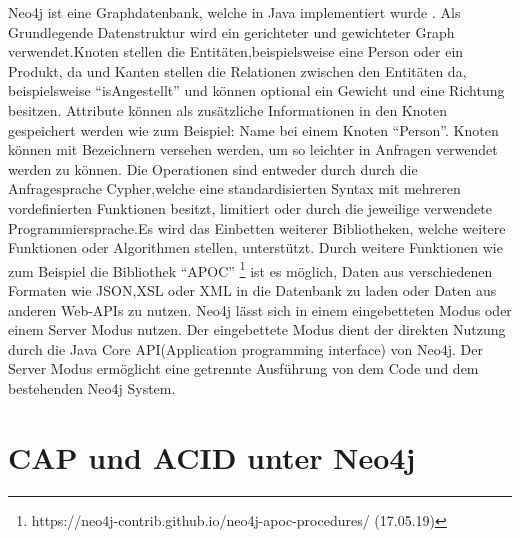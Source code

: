 Neo4j ist eine Graphdatenbank, welche in Java implementiert wurde \parencite{vukotic2015neo4j}. Als Grundlegende Datenstruktur wird ein gerichteter und gewichteter  Graph verwendet.Knoten stellen die Entitäten,beispielsweise eine Person oder ein Produkt,  da und  Kanten stellen die Relationen zwischen den Entitäten da, beispielsweise “isAngestellt” und können optional ein Gewicht und eine Richtung besitzen. Attribute können als zusätzliche Informationen in den Knoten gespeichert  werden wie zum Beispiel: Name bei einem Knoten “Person”. Knoten können mit Bezeichnern versehen werden, um so leichter in Anfragen  verwendet werden zu können. Die Operationen sind entweder durch durch die  Anfragesprache  Cypher,welche eine standardisierten Syntax mit  mehreren vordefinierten Funktionen besitzt, limitiert oder durch die jeweilige verwendete Programmiersprache.Es wird das Einbetten weiterer Bibliotheken, welche weitere Funktionen oder Algorithmen stellen, unterstützt. Durch weitere Funktionen wie zum Beispiel die Bibliothek “APOC” \footnote{https://neo4j-contrib.github.io/neo4j-apoc-procedures/ (17.05.19) } ist es möglich, Daten aus verschiedenen Formaten wie JSON,XSL oder XML in die Datenbank zu laden oder Daten aus anderen Web-APIs zu nutzen. Neo4j lässt sich in einem  eingebetteten Modus oder einem  Server Modus nutzen. Der eingebettete Modus dient der direkten  Nutzung durch die Java Core API(Application programming interface)  von Neo4j. Der Server Modus ermöglicht eine getrennte Ausführung von dem Code und dem bestehenden Neo4j System.


\section{CAP und ACID unter Neo4j}


